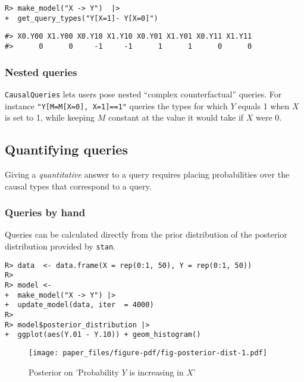 \documentclass[
  11pt,
  article]{jss}
\begin{document}
\begin{verbatim}
R> make_model("X -> Y")  |>
+  get_query_types("Y[X=1]- Y[X=0]")
\end{verbatim}

\begin{verbatim}
#> X0.Y00 X1.Y00 X0.Y10 X1.Y10 X0.Y01 X1.Y01 X0.Y11 X1.Y11 
#>      0      0     -1     -1      1      1      0      0
\end{verbatim}

\hypertarget{nested-queries}{%
\subsubsection{Nested queries}\label{nested-queries}}

\texttt{CausalQueries} lets users pose nested ``complex counterfactual''
queries. For instance \texttt{"Y{[}M=M{[}X=0{]},\ X=1{]}==1"} queries
the types for which \(Y\) equals 1 when \(X\) is set to 1, while keeping
\(M\) constant at the value it would take if \(X\) were 0.

\hypertarget{quantifying-queries}{%
\subsection{Quantifying queries}\label{quantifying-queries}}

Giving a \emph{quantitative} answer to a query requires placing
probabilities over the causal types that correspond to a query.

\hypertarget{queries-by-hand}{%
\subsubsection{Queries by hand}\label{queries-by-hand}}

Queries can be calculated directly from the prior distribution of the
posterior distribution provided by \texttt{stan}.

\begin{verbatim}
R> data  <- data.frame(X = rep(0:1, 50), Y = rep(0:1, 50))
R> 
R> model <- 
+  make_model("X -> Y") |>
+  update_model(data, iter  = 4000)
R> 
R> model$posterior_distribution |> 
+  ggplot(aes(Y.01 - Y.10)) + geom_histogram()
\end{verbatim}

\begin{figure}[t]

{\centering \texttt{[image: paper\_files/figure-pdf/fig-posterior-dist-1.pdf]}

}

\caption{\label{fig-posterior-dist}Posterior on 'Probability \(Y\) is
increasing in \(X\)'}

\end{figure}
\end{document}
